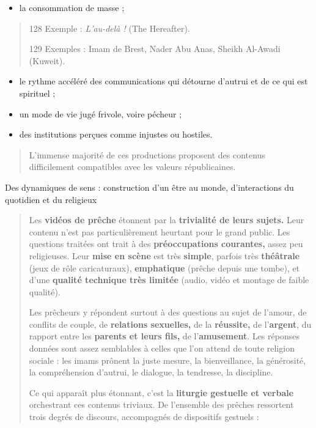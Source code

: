 \begin{itemize}
\item
  la consommation de masse ;
\end{itemize}

\begin{quote}
128 Exemple : \emph{L'au-delà !} (The Hereafter).

129 Exemples : Imam de Brest, Nader Abu Anas, Sheikh Al-Awadi (Kuweit).


\end{quote}

\begin{itemize}
\item
  le rythme accéléré des communications qui détourne d'autrui et de ce
  qui est spirituel ;
\item
  un mode de vie jugé frivole, voire pécheur ;
\item
  des institutions perçues comme injustes ou hostiles.
\end{itemize}

\begin{quote}
L'immense majorité de ces productions proposent des contenus
difficilement compatibles avec les valeurs républicaines.
\end{quote}

Des dynamiques de sens : construction d'un être au monde, d'interactions
du quotidien et du religieux

\begin{quote}
Les \textbf{vidéos de prêche} étonnent par la \textbf{trivialité de
leurs sujets.} Leur contenu n'est pas particulièrement heurtant pour le
grand public. Les questions traitées ont trait à des
\textbf{préoccupations courantes,} assez peu religieuses. Leur
\textbf{mise en scène} est très \textbf{simple}, parfois très
\textbf{théâtrale} (jeux de rôle caricaturaux), \textbf{emphatique}
(prêche depuis une tombe), et d'une \textbf{qualité technique très
limitée} (audio, vidéo et montage de faible qualité).

Les prêcheurs y répondent surtout à des questions au sujet de l'amour,
de conflits de couple, de \textbf{relations sexuelles,} de la
\textbf{réussite,} de l'\textbf{argent}, du rapport entre les
\textbf{parents et leurs fils,} de l'\textbf{amusement}. Les réponses
données sont assez semblables à celles que l'on attend de toute religion
sociale : les imams prônent la juste mesure, la bienveillance, la
générosité, la compréhension d'autrui, le dialogue, la tendresse, la
discipline.

Ce qui apparaît plus étonnant, c'est la \textbf{liturgie gestuelle et
verbale} orchestrant ces contenus triviaux. De l'ensemble des prêches
ressortent trois degrés de discours, accompagnés de dispositifs gestuels
:
\end{quote}

